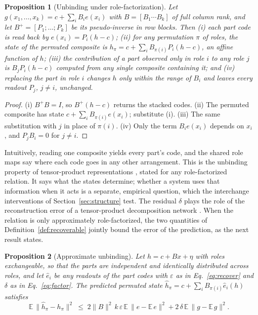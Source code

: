\documentclass[10pt]{article}
\theoremstyle{plain}
\newtheorem{proposition}{Proposition}
\theoremstyle{remark}
\begin{document}
\begin{proposition}[Unbinding under role-factorization]
\label{prop:systematic}
Let $g(x_1, \ldots, x_k) = c + \sum_i B_i e(x_i)$ with $B = [B_1 \cdots B_k]$ of full column rank, and let $B^{+} = [P_1; \ldots; P_k]$ be its pseudo-inverse in row blocks. Then (i) each part code is read back by $e(x_i) = P_i(h - c)$; (ii) for any permutation $\pi$ of roles, the state of the permuted composite is $h_\pi = c + \sum_i B_{\pi(i)} P_i (h - c)$, an affine function of $h$; (iii) the contribution of a part observed only in role $i$ to any role $j$ is $B_j P_i (h - c)$ computed from any single composite containing it; and (iv) replacing the part in role $i$ changes $h$ only within the range of $B_i$ and leaves every readout $P_j$, $j \ne i$, unchanged.
\end{proposition}

\begin{proof}
(i) $B^{+}B = I$, so $B^{+}(h - c)$ returns the stacked codes. (ii) The permuted composite has state $c + \sum_i B_{\pi(i)} e(x_i)$; substitute (i). (iii) The same substitution with $j$ in place of $\pi(i)$. (iv) Only the term $B_i e(x_i)$ depends on $x_i$, and $P_j B_i = 0$ for $j \neq i$.
\end{proof}

\noindent
Intuitively, reading one composite yields every part's code, and the shared role maps say where each code goes in any other arrangement. This is the unbinding property of tensor-product representations \citep{smolensky1990}, stated for any role-factorized relation. It says what the states determine; whether a system uses that information when it acts is a separate, empirical question, which the interchange interventions of Section~\ref{sec:structure} test. The residual $\delta$ plays the role of the reconstruction error of a tensor-product decomposition network \citep{mccoy2019}. When the relation is only approximately role-factorized, the two quantities of Definition~\ref{def:recoverable} jointly bound the error of the prediction, as the next result states.

\begin{proposition}[Approximate unbinding]
\label{prop:approx}
Let $h = c + Bx + \eta$ with roles exchangeable, so that the parts are independent and identically distributed across roles, and let $\hat{e}_i$ be any readouts of the part codes with $\varepsilon$ as in Eq.~\eqref{eq:recover} and $\delta$ as in Eq.~\eqref{eq:factor}. The predicted permuted state $\hat{h}_\pi = c + \sum_i B_{\pi(i)}\hat{e}_i(h)$ satisfies
\begin{equation}
  \mathbb{E}\,\lVert \hat{h}_\pi - h_\pi \rVert^2 \;\le\; 2\lVert B \rVert^2\, k\,\varepsilon\, \mathbb{E}\,\lVert e - \mathbb{E}\,e \rVert^2 + 2\,\delta\, \mathbb{E}\,\lVert g - \mathbb{E}\,g \rVert^2 .
\end{equation}
\end{proposition}
\end{document}
